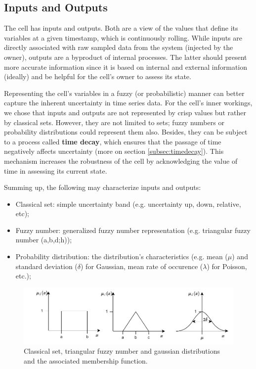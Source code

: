 
\subsection{Inputs and Outputs}

The cell has inputs and outputs. Both are a view of the values that define its variables at a given timestamp, which is continuously rolling. While inputs are directly associated with raw sampled data from the system (injected by the owner), outputs are a byproduct of internal processes. The latter should present more accurate information since it is based on internal and external information (ideally) and be helpful for the cell's owner to assess its state.

Representing the cell's variables in a fuzzy (or probabilistic) manner can better capture the inherent uncertainty in time series data. For the cell's inner workings, we chose that inputs and outputs are not represented by crisp values but rather by classical sets. However, they are not limited to sets; fuzzy numbers or probability distributions could represent them also. Besides, they can be subject to a process called \textbf{time decay}, which ensures that the passage of time negatively affects uncertainty (more on section \ref{subsec:timedecay}). This mechanism increases the robustness of the cell by acknowledging the value of time in assessing its current state.

Summing up, the following may characterize inputs and outputs:

\begin{itemize}
    \item Classical set: simple uncertainty band (e.g. uncertainty up, down, relative, etc);
    \item Fuzzy number: generalized fuzzy number representation \cite{Zhang2019} (e.g. triangular fuzzy number (a,b,d;h));
    \item Probability distribution: the distribution's characteristics (e.g. mean ($\mu$) and standard deviation ($\delta$) for Gaussian, mean rate of occurence ($\lambda$) for Poisson, etc.);
\end{itemize}

\begin{figure}[h!]
    \centering
    \includegraphics[width=15cm]{figures/chapter4/cell/classic_fuzzy_gaussian.pdf}
    \caption{Classical set, triangular fuzzy number and gaussian distributions and the associated membership function.}
    \label{fig:classicfuzzygaussian}
\end{figure}

